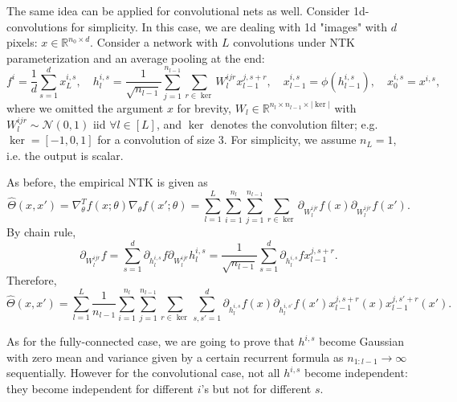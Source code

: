 \documentclass{article}
\newcommand{\RR}{\mathbb{R}}
\newcommand{\NN}{\mathcal{N}}
\begin{document}
    The same idea can be applied for convolutional nets as well.
    Consider 1d-convolutions for simplicity.
    In this case, we are dealing with 1d "images" with $d$ pixels: $x \in \RR^{n_0 \times d}$.
    Consider a network with $L$ convolutions under NTK parameterization and an average pooling at the end:
    \begin{equation}
        f^i = \frac{1}{d} \sum_{s=1}^d x_L^{i,s},
        \quad
        h_l^{i,s} = \frac{1}{\sqrt{n_{l-1}}} \sum_{j=1}^{n_{l-1}} \sum_{r \in \ker} W_l^{ijr} x_{l-1}^{j,s+r},
        \quad
        x_{l-1}^{i,s} = \phi(h_{l-1}^{i,s}),
        \quad
        x_0^{i,s} = x^{i,s},
    \end{equation}
    where we omitted the argument $x$ for brevity, $W_l \in \RR^{n_l \times n_{l-1} \times |\ker|}$ with $W_l^{ijr} \sim \NN(0,1)$ iid $\forall l \in [L]$, and $\ker$ denotes the convolution filter; e.g. $\ker = [-1,0,1]$ for a convolution of size $3$.
    For simplicity, we assume $n_L=1$, i.e. the output is scalar.

    As before, the empirical NTK is given as
    \begin{equation}
        \hat\Theta(x,x')
        = \nabla^T_\theta f(x;\theta) \nabla_\theta f(x';\theta)
        = \sum_{l=1}^L \sum_{i=1}^{n_l} \sum_{j=1}^{n_{l-1}} \sum_{r \in \ker} \partial_{W_l^{ijr}} f(x) \partial_{W_l^{ijr}} f(x').
    \end{equation}
    By chain rule,
    \begin{equation}
        \partial_{W_l^{ijr}} f
        = \sum_{s=1}^d \partial_{h_l^{i,s}} f \partial_{W_l^{ijr}} h_l^{i,s}
        = \frac{1}{\sqrt{n_{l-1}}} \sum_{s=1}^{d} \partial_{h_l^{i,s}} f x_{l-1}^{j,s+r}.
    \end{equation}
    Therefore,
    \begin{equation}
        \hat\Theta(x,x')
        = \sum_{l=1}^L \frac{1}{n_{l-1}} \sum_{i=1}^{n_l} \sum_{j=1}^{n_{l-1}} \sum_{r \in \ker} \sum_{s,s'=1}^{d} \partial_{h_l^{i,s}} f(x) \partial_{h_l^{i,s'}} f(x') x_{l-1}^{j,s+r}(x) x_{l-1}^{j,s'+r}(x').
    \end{equation}

    As for the fully-connected case, we are going to prove that $h^{i,s}$ become Gaussian with zero mean and variance given by a certain recurrent formula as $n_{1:l-1} \to \infty$ sequentially.
    However for the convolutional case, not all $h^{i,s}$ become independent: they become independent for different $i$'s but not for different $s$.
\end{document}
